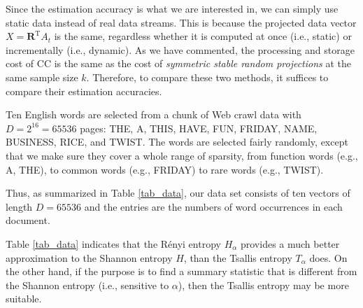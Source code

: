 \documentclass{sig-alternate}
\begin{document}
Since the estimation accuracy is what we are interested in, we can simply use static data instead of real data streams. This is because the projected data vector $X = \mathbf{R}^\text{T} A_t$ is the same, regardless whether it is computed at once  (i.e., static) or incrementally (i.e., dynamic). As we have commented, the processing and storage cost of CC is the same as the cost of {\em symmetric stable random projections} at the same sample size $k$. Therefore, to compare these two methods, it suffices to compare their estimation accuracies.

Ten English words are selected from a chunk of Web crawl data with $D = 2^{16} = 65536$ pages: THE, A, THIS, HAVE, FUN, FRIDAY, NAME, BUSINESS, RICE, and TWIST. The words are selected fairly randomly, except that we make sure they cover a whole range of sparsity, from function words (e.g., A, THE), to  common words (e.g., FRIDAY) to rare words (e.g., TWIST).

Thus, as summarized in Table \ref{tab_data},  our data set consists of ten vectors of length $D = 65536$ and the entries are the numbers of word occurrences in each document.

Table \ref{tab_data} indicates that the R\'enyi entropy $H_\alpha$ provides a much better approximation to the Shannon entropy $H$, than the Tsallis entropy $T_\alpha$ does. On the other hand, if the purpose is to find a summary statistic that is different from the Shannon entropy (i.e., sensitive to $\alpha$), then the Tsallis entropy may be more suitable.
\end{document}
